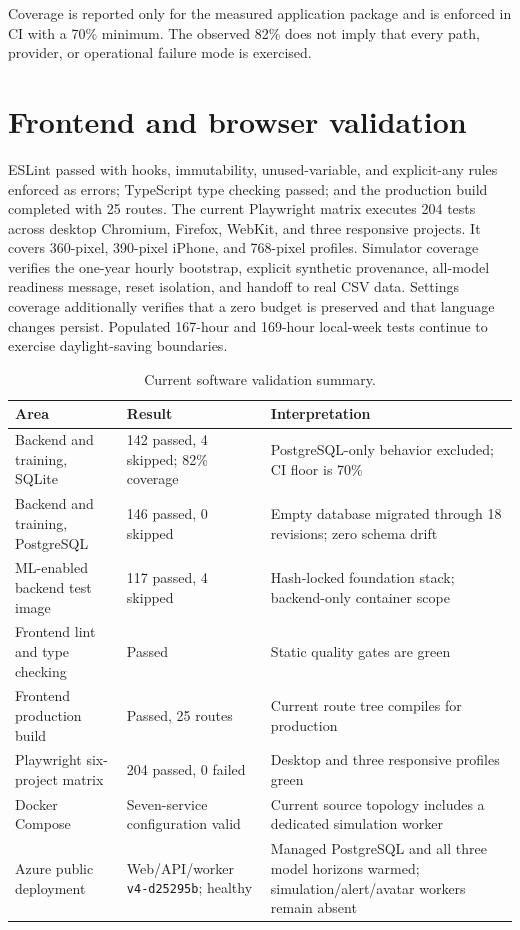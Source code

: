 Coverage is reported only for the measured application package and is enforced in CI with a 70\% minimum. The observed 82\% does not imply that every path, provider, or operational failure mode is exercised.

\section{Frontend and browser validation}

ESLint passed with hooks, immutability, unused-variable, and explicit-any rules enforced as errors; TypeScript type checking passed; and the production build completed with 25 routes. The current Playwright matrix executes 204 tests across desktop Chromium, Firefox, WebKit, and three responsive projects. It covers 360-pixel, 390-pixel iPhone, and 768-pixel profiles. Simulator coverage verifies the one-year hourly bootstrap, explicit synthetic provenance, all-model readiness message, reset isolation, and handoff to real CSV data. Settings coverage additionally verifies that a zero budget is preserved and that language changes persist. Populated 167-hour and 169-hour local-week tests continue to exercise daylight-saving boundaries.

\begin{table}[H]
\centering
\caption{Current software validation summary.}
\label{tab:testsummary}
\begin{tabularx}{\textwidth}{p{}p{}Y}
\toprule
Area & Result & Interpretation \\
\midrule
Backend and training, SQLite & 142 passed, 4 skipped; 82\% coverage & PostgreSQL-only behavior excluded; CI floor is 70\% \\
Backend and training, PostgreSQL & 146 passed, 0 skipped & Empty database migrated through 18 revisions; zero schema drift \\
ML-enabled backend test image & 117 passed, 4 skipped & Hash-locked foundation stack; backend-only container scope \\
Frontend lint and type checking & Passed & Static quality gates are green \\
Frontend production build & Passed, 25 routes & Current route tree compiles for production \\
Playwright six-project matrix & 204 passed, 0 failed & Desktop and three responsive profiles green \\
Docker Compose & Seven-service configuration valid & Current source topology includes a dedicated simulation worker \\
Azure public deployment & Web/API/worker \texttt{v4-d25295b}; healthy & Managed PostgreSQL and all three model horizons warmed; simulation/alert/avatar workers remain absent \\
\bottomrule
\end{tabularx}
\end{table}

